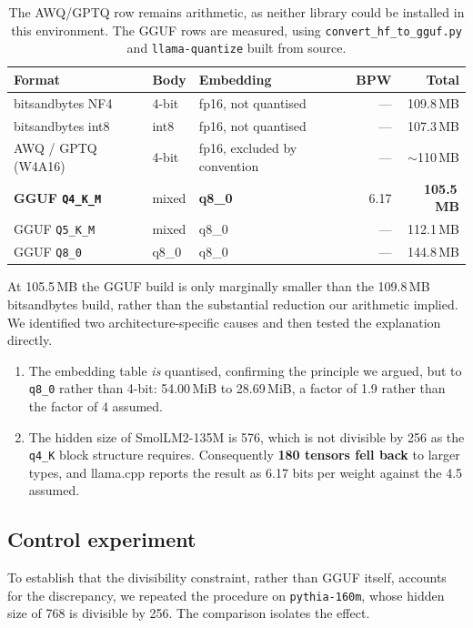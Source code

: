 \documentclass[11pt,a4paper]{article}
\newcommand{\code}[1]{\texttt{\small #1}}
\begin{document}
\begin{table}[H]
\caption{The AWQ/GPTQ row remains arithmetic, as neither library could be
installed in this environment. The GGUF rows are measured, using
\code{convert\_hf\_to\_gguf.py} and \code{llama-quantize} built from source.}
\begin{tabularx}{\textwidth}{@{}YL{28mm}L{34mm}rr@{}}
\toprule
\textbf{Format} & \textbf{Body} & \textbf{Embedding} & \textbf{BPW} & \textbf{Total} \\
\midrule
bitsandbytes NF4 & 4-bit & fp16, not quantised & --- & 109.8\,MB \\
bitsandbytes int8 & int8 & fp16, not quantised & --- & 107.3\,MB \\
AWQ / GPTQ (W4A16) & 4-bit & fp16, excluded by convention & --- & $\sim$110\,MB \\
\textbf{GGUF \code{Q4\_K\_M}} & mixed & \textbf{q8\_0} & 6.17 & \textbf{105.5\,MB} \\
GGUF \code{Q5\_K\_M} & mixed & q8\_0 & --- & 112.1\,MB \\
GGUF \code{Q8\_0} & q8\_0 & q8\_0 & --- & 144.8\,MB \\
\bottomrule
\end{tabularx}
\end{table}

At 105.5\,MB the GGUF build is only marginally smaller than the 109.8\,MB
bitsandbytes build, rather than the substantial reduction our arithmetic
implied. We identified two architecture-specific causes and then tested the
explanation directly.

\begin{enumerate}[leftmargin=*,itemsep=3pt]
\item The embedding table \emph{is} quantised, confirming the principle we
argued, but to \code{q8\_0} rather than 4-bit: 54.00\,MiB to 28.69\,MiB, a factor
of 1.9 rather than the factor of 4 assumed.
\item The hidden size of SmolLM2-135M is 576, which is not divisible by 256 as
the \code{q4\_K} block structure requires. Consequently \textbf{180 tensors fell
back} to larger types, and llama.cpp reports the result as 6.17 bits per weight
against the 4.5 assumed.
\end{enumerate}

\subsection{Control experiment}

To establish that the divisibility constraint, rather than GGUF itself, accounts
for the discrepancy, we repeated the procedure on \code{pythia-160m}, whose
hidden size of 768 is divisible by 256. The comparison isolates the effect.
\end{document}
